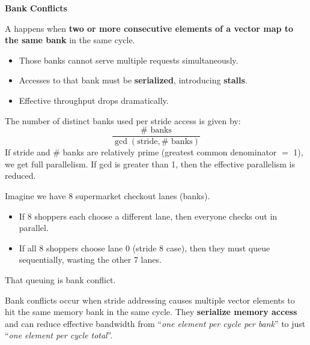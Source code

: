 \highspace
\begin{flushleft}
    \textcolor{Red2}{ \textbf{Bank Conflicts}}
\end{flushleft}
A  happens when \textbf{two or more consecutive elements of a vector map to the same bank} in the same cycle.
\begin{itemize}
    \item[\textcolor{Red2}{\faIcon{times}}] Those banks cannot serve multiple requests simultaneously.
    \item[\textcolor{Red2}{\faIcon{times}}] Accesses to that bank must be \textbf{serialized}, introducing \textbf{stalls}.
    \item[\textcolor{Red2}{\faIcon{times}}] Effective throughput drops dramatically.
\end{itemize}
The number of distinct banks used per stride access is given by:
\begin{equation}
    \dfrac{\#\text{ banks}}{\gcd \left(\text{stride}, \#\text{ banks}\right)}
\end{equation}
If stride and $\#$ banks are relatively prime (greatest common denominator $=$ 1), we get full parallelism. If gcd is greater than 1, then the effective parallelism is reduced.

\highspace
\begin{examplebox}[: Analogy]
    Imagine we have 8 supermarket checkout lanes (banks).
    \begin{itemize}
        \item If 8 shoppers each choose a different lane, then everyone checks out in parallel.
        \item If all 8 shoppers choose lane 0 (stride 8 case), then they must queue sequentially, wasting the other 7 lanes.
    \end{itemize}
    That queuing is bank conflict.
\end{examplebox}

\highspace
Bank conflicts occur when stride addressing causes multiple vector elements to hit the same memory bank in the same cycle. They \textbf{serialize memory access} and can reduce effective bandwidth from ``\emph{one element per cycle per bank}'' to just ``\emph{one element per cycle total}''.

